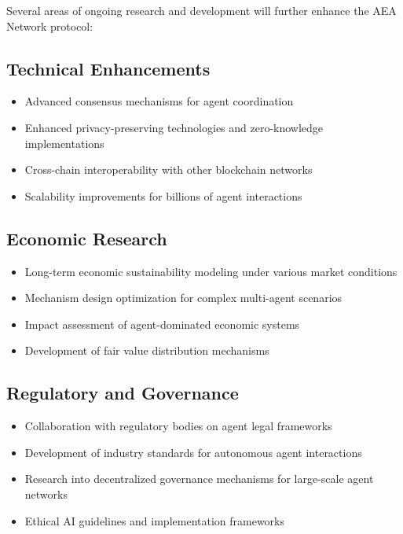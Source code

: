 \documentclass[12pt,a4paper]{article}
\begin{document}
Several areas of ongoing research and development will further enhance the AEA Network protocol:

\subsection{Technical Enhancements}
\begin{itemize}
\item Advanced consensus mechanisms for agent coordination
\item Enhanced privacy-preserving technologies and zero-knowledge implementations
\item Cross-chain interoperability with other blockchain networks
\item Scalability improvements for billions of agent interactions
\end{itemize}

\subsection{Economic Research}
\begin{itemize}
\item Long-term economic sustainability modeling under various market conditions
\item Mechanism design optimization for complex multi-agent scenarios
\item Impact assessment of agent-dominated economic systems
\item Development of fair value distribution mechanisms
\end{itemize}

\subsection{Regulatory and Governance}
\begin{itemize}
\item Collaboration with regulatory bodies on agent legal frameworks
\item Development of industry standards for autonomous agent interactions
\item Research into decentralized governance mechanisms for large-scale agent networks
\item Ethical AI guidelines and implementation frameworks
\end{itemize}
\end{document}
